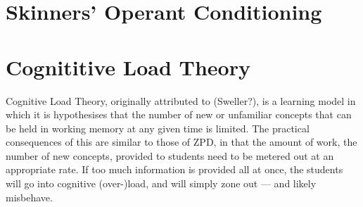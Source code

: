 \documentclass[12pt]{report}
\begin{document}
\begin{appendices}
\section{Skinners' Operant Conditioning}

\section{Cognititive Load Theory}

Cognitive Load Theory, originally attributed to (Sweller?), is a learning model in which it is hypothesises that the number of new or unfamiliar concepts that can be held in working memory at any given time is limited. The practical consequences of this are similar to those of ZPD, in that the amount of work, the number of new concepts, provided to students need to be metered out at an appropriate rate. If too much information is provided all at once, the students will go into cognitive (over-)load, and will simply zone out --- and likely misbehave.


\end{appendices}

{}

\end{document}
